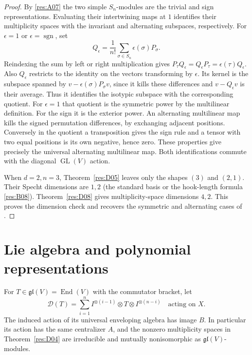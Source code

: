 \begin{proof}
By \ref{res:A07} the two simple \(S_n\)-modules are the
trivial and sign representations. Evaluating their intertwining
maps at \(1\) identifies their multiplicity spaces with the
invariant and alternating subspaces, respectively. For
\(\epsilon=1\) or \(\epsilon=\operatorname{sgn}\), set
\[
 Q_\epsilon=\frac{1}{n!}\sum_{\sigma\in S_n}\epsilon(\sigma)P_\sigma .
\]
Reindexing the sum by left or right multiplication gives
\(P_\tau Q_\epsilon=Q_\epsilon P_\tau=\epsilon(\tau)Q_\epsilon\).
Also \(Q_\epsilon\) restricts to the identity on the vectors
transforming by \(\epsilon\). Its kernel is the subspace
spanned by \(v-\epsilon(\sigma)P_\sigma v\), since it kills
these differences and \(v-Q_\epsilon v\) is their average.
Thus it identifies the isotypic subspace with the corresponding
quotient. For \(\epsilon=1\) that quotient is the symmetric
power by the multilinear definition. For the sign it is the exterior
power. An alternating multilinear map kills the signed
permutation differences, by exchanging adjacent positions.
Conversely in the quotient a transposition gives the sign rule and
a tensor with two equal positions is its own negative, hence
zero. These properties give precisely the universal
alternating multilinear map. Both identifications commute
with the diagonal \(\operatorname{GL}(V)\) action.

When \(d=2,n=3\), Theorem~\ref{res:D05} leaves only the
shapes \((3)\) and \((2,1)\). Their Specht dimensions are
\(1,2\) (the standard basis or the hook-length formula
\ref{res:B08}). Theorem~\ref{res:D08} gives multiplicity-space
dimensions \(4,2\). This proves the dimension check and
recovers the symmetric and alternating cases of
\cite[Example 4.60]{etingof}.
\end{proof}

\section{Lie algebra and polynomial representations}

\begin{corollary}
\label{res:D10}
For \(T\in\mathfrak{gl}(V)=\operatorname{End}(V)\) with the
commutator bracket, let
\[
 \mathcal D(T)=\sum_{i=1}^n
       I^{\otimes(i-1)}\otimes T\otimes I^{\otimes(n-i)}
       \quad\text{acting on }X.
\]
The induced action of its universal enveloping algebra has
image \(B\). In particular its action has the same centralizer
\(A\), and the nonzero multiplicity spaces in
Theorem~\ref{res:D04} are irreducible and mutually
nonisomorphic as \(\mathfrak{gl}(V)\)-modules.
\end{corollary}

